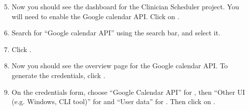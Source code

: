 \documentclass[letterpaper,10pt,english]{sphinxmanual}
\begin{document}
\begin{figure}[h!]
\centering
{}\end{figure}
\begin{enumerate}
\setcounter{enumi}{4}
\item {} 
Now you should see the dashboard for the Clinician Scheduler project.
You will need to enable the Google calendar API. Click on .

\end{enumerate}

\begin{figure}[h!]
\centering
{}\end{figure}
\begin{enumerate}
\setcounter{enumi}{5}
\item {} 
Search for “Google calendar API” using the search bar, and select it.

\end{enumerate}

\begin{figure}[h!]
\centering
{}\end{figure}
\begin{enumerate}
\setcounter{enumi}{6}
\item {} 
Click .

\end{enumerate}

\begin{figure}[h!]
\centering
{}\end{figure}
\begin{enumerate}
\setcounter{enumi}{7}
\item {} 
Now you should see the overview page for the Google calendar API.
To generate the credentials, click .

\end{enumerate}

\begin{figure}[h!]
\centering
{}\end{figure}
\begin{enumerate}
\setcounter{enumi}{8}
\item {} 
On the credentials form, choose “Google Calendar API” for ,
then “Other UI (e.g. Windows, CLI tool)” for 
and “User data” for . Then click on .

\end{enumerate}
\end{document}
